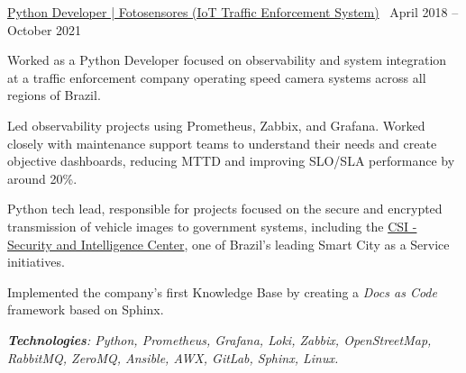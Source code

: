 \documentclass[10pt,a4paper]{altacv}
\begin{document}
\medskip

\divider

{\large \href{https://fotosensores.com/}{Python Developer | Fotosensores (IoT Traffic Enforcement System)}} \hfill \faCalendar \ April 2018 -- October 2021

\bigskip
\bigskip

Worked as a Python Developer focused on observability and system integration at a traffic enforcement company operating speed camera systems across all regions of Brazil.

\medskip

Led observability projects using Prometheus, Zabbix, and Grafana. Worked closely with maintenance support teams to understand their needs and create objective dashboards, reducing MTTD and improving SLO/SLA performance by around 20\%.

\medskip

Python tech lead, responsible for projects focused on the secure and encrypted transmission of vehicle images to government systems, including the \href{https://www.sjc.sp.gov.br/servicos/protecao-ao-cidadao/csi/}{CSI - Security and Intelligence Center}, one of Brazil's leading Smart City as a Service initiatives.

\medskip

Implemented the company's first Knowledge Base by creating a \textit{Docs as Code} framework based on Sphinx.

\medskip

\textit{\textbf{Technologies}: Python, Prometheus, Grafana, Loki, Zabbix, OpenStreetMap, RabbitMQ, ZeroMQ, Ansible, AWX, GitLab, Sphinx, Linux.}

\bigskip
\bigskip

\end{document}
